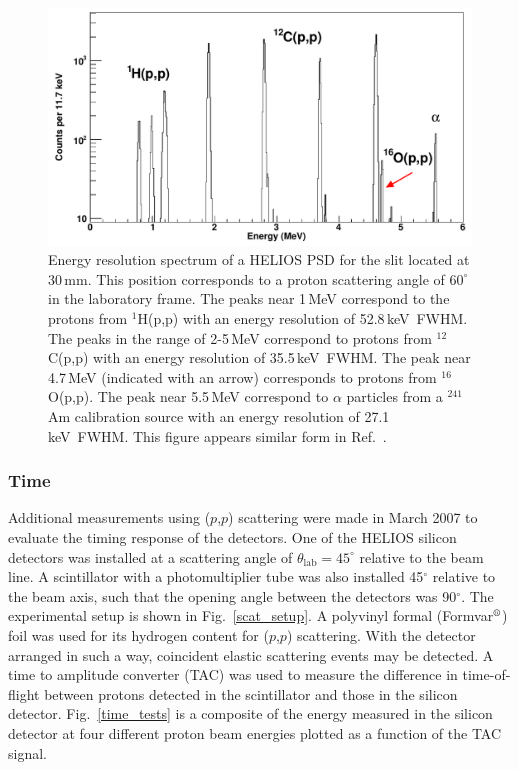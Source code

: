 \begin{figure}
\centering
\includegraphics[height=0.5\textheight,width=\linewidth,keepaspectratio]{Figures/out5}
\caption[Energy resolution spectrum of a HELIOS PSD for the slit located at 30\,mm]{Energy resolution spectrum of a HELIOS PSD for the slit located at 30\,mm.  This position corresponds to a proton scattering angle of $60^\circ$ in the laboratory frame.  The peaks near 1\,MeV correspond to the protons from $^1$H(p,p) with an energy resolution of 52.8\,keV~FWHM.  The peaks in the range of 2-5\,MeV 
 correspond to protons from $^{12}$C(p,p) with an energy resolution of 35.5\,keV~FWHM.  The peak near 4.7\,MeV 
 (indicated with an arrow) corresponds to protons from $^{16}$O(p,p).  The peak near 5.5\,MeV correspond to $\alpha$ 
 particles from a $^{241}$Am calibration source with an energy resolution of 27.1\,keV~FWHM.  This figure appears similar form in Ref.~\cite{Lighthall_2010}.
 }
\label{psd_energy}
\end{figure}

\subsubsection{Time}
Additional measurements using ($p$,$p$) scattering were made in March 2007 to evaluate the timing response of the detectors.  One of the HELIOS silicon detectors was installed at a scattering angle of $\theta_\mathrm{lab}=45^\circ$ relative to the beam line. A scintillator with a photomultiplier tube was also installed 45$^\circ$ relative to the beam axis, such that the opening angle between the detectors was 90$^\circ$.  The experimental setup is shown in Fig.~\ref{scat_setup}.  
A polyvinyl formal (Formvar$\textsuperscript{\textregistered}$) foil was used for its hydrogen content for ($p$,$p$) scattering.  With the detector arranged in such a way, coincident elastic scattering events may be detected.  A time to amplitude converter (TAC) was used to measure the difference in time-of-flight between protons detected in the scintillator and those in the silicon detector.  Fig.~\ref{time_tests} is a composite of the energy measured in the silicon detector at four different proton beam energies plotted as a function of the TAC signal.


